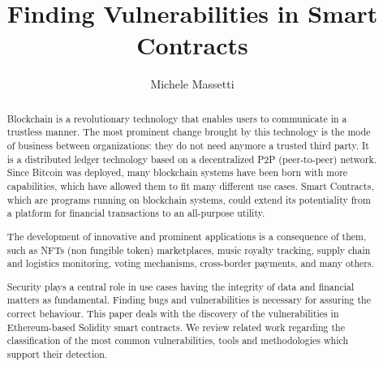 \documentclass[a4paper,sigconf, language=french,
language=german, language=spanish, language=english]{acmart}
\begin{document}
\title{Finding Vulnerabilities in Smart Contracts}


\author{Michele Massetti}

\renewcommand{\shortauthors}{Massetti.}

\begin{abstract}
Blockchain is a revolutionary technology that enables users to communicate in a trustless manner. 
The most prominent change brought by this technology is the mode of business between organizations: they do not need anymore a trusted third party. 
It is a distributed ledger technology based on a decentralized P2P (peer-to-peer) network. 
Since Bitcoin was deployed, many blockchain systems have been born with more capabilities, which have allowed them to fit many
different use cases. Smart Contracts, which are programs running on blockchain systems, could extend its potentiality from a platform for financial transactions to an all-purpose utility.

The development of innovative and prominent applications is a consequence of them, such as NFTs (non fungible token) marketplaces, music royalty tracking, supply chain and logistics monitoring, voting mechanisms, 
cross-border payments, and many others.

Security plays a central role in use cases having the integrity of data and financial matters as fundamental. Finding bugs and vulnerabilities is necessary for assuring the correct behaviour. 
This paper deals with the discovery of the vulnerabilities in Ethereum-based Solidity smart contracts. We review related work regarding the classification of the most common vulnerabilities, tools and methodologies which support their detection.
\end{abstract}
\end{document}
